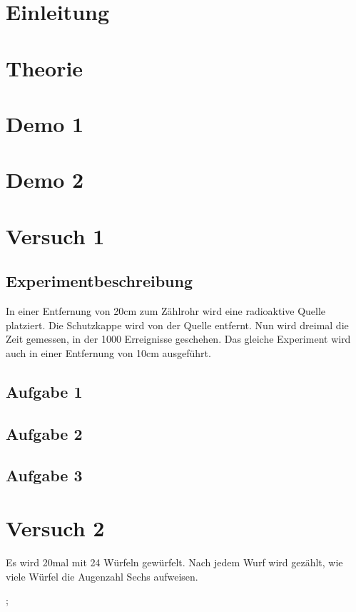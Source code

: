 \documentclass[12pt, a4paper, twoside]{article}
\begin{document}
\maketitlepage


\section{Einleitung}
\section{Theorie}
\section{Demo 1}
\section{Demo 2}
\section{Versuch 1}
\subsection{Experimentbeschreibung}
In einer Entfernung von 20cm zum Zählrohr wird eine radioaktive Quelle platziert.
Die Schutzkappe wird von der Quelle entfernt.
Nun wird dreimal die Zeit gemessen, in der 1000 Erreignisse geschehen.
Das gleiche Experiment wird auch in einer Entfernung von 10cm ausgeführt.
\subsection{Aufgabe 1}

\subsection{Aufgabe 2}

\subsection{Aufgabe 3}

\section{Versuch 2}
Es wird 20mal mit 24 Würfeln gewürfelt.
Nach jedem Wurf wird gezählt, wie viele Würfel die Augenzahl Sechs aufweisen.

;
\end{document}
